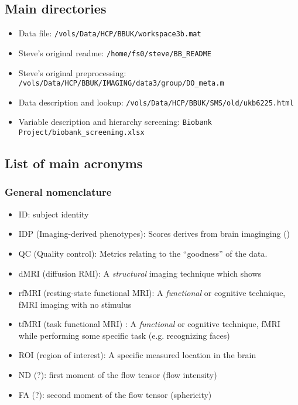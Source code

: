 \documentclass{article}
\begin{document}
\subsection{Main directories\label{sec:data-dir}}

\begin{itemize}
\item Data file: {\tt /vols/Data/HCP/BBUK/workspace3b.mat}
\item Steve's original readme: {\tt /home/fs0/steve/BB\_README}
\item Steve's original preprocessing: {\tt /vols/Data/HCP/BBUK/IMAGING/data3/group/DO\_meta.m}
\item Data description and lookup: {\tt /vols/Data/HCP/BBUK/SMS/old/ukb6225.html}
\item Variable description and hierarchy screening: {\tt Biobank Project/biobank\_screening.xlsx}
\end{itemize}

\subsection{List of main acronyms\label{sec:data-acro}}

\subsubsection{General nomenclature}
\begin{itemize}
\item ID: subject identity
\item IDP (Imaging-derived phenotypes): Scores derives from brain imaginging ()
\item QC (Quality control): Metrics relating to the ``goodness'' of the data.
\item dMRI (diffusion RMI): A \emph{structural} imaging technique which shows
\item rfMRI (resting-state functional MRI): A \emph{functional} or cognitive technique, fMRI imaging with no stimulus
\item tfMRI (task functional MRI) : A \emph{functional} or cognitive technique, fMRI while performing some specific task (e.g. recognizing faces)
\item ROI (region of interest): A specific measured location in the brain
\item ND (?): first moment of the flow tensor (flow intensity)
\item FA (?): second moment of the flow tensor (sphericity)
\end{itemize}
\end{document}
